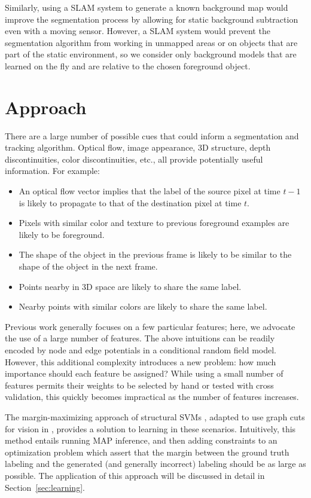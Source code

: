 \documentclass[journal]{IEEEtran}
\begin{document}
Similarly, using a SLAM system to generate a known background map
would improve the segmentation process by allowing for static background subtraction even with a moving sensor. However, a SLAM system would prevent the segmentation algorithm from working in unmapped areas or on objects that are part of the static environment, so we consider only background models that are learned on the fly and are relative to the chosen foreground object.

\section{Approach}

There are a large number of possible cues that could inform a segmentation and tracking algorithm.  Optical flow, image appearance, 3D structure, depth discontinuities, color discontinuities, etc., all provide potentially useful information.  For example:
\begin{itemize}
  \item An optical flow vector implies that the label of the source pixel at time $t-1$ is likely to propagate to that of the destination pixel at time $t$.
\item Pixels with similar color and texture to previous foreground examples are likely to be foreground.
\item The shape of the object in the previous frame is likely to be similar to the shape of the object in the next frame.
\item Points nearby in 3D space are likely to share the same label.
\item Nearby points with similar colors are likely to share the same label.
\end{itemize}

Previous work generally focuses on a few particular features; here, we advocate the use of a large number of features.  The above intuitions can be readily encoded by node and edge potentials in a conditional random field model.  However, this additional complexity introduces a new problem: how much importance should each feature be assigned?  While using a small number of features permits their weights to be selected by hand or tested with cross validation, this quickly becomes impractical as the number of features increases.

The margin-maximizing approach of structural SVMs \cite{taskar2005a, tsochantaridis2005a}, adapted to use graph cuts for vision in \cite{szummer2008a}, provides a solution to learning in these scenarios.  Intuitively, this method entails running MAP inference, and then adding constraints to an optimization problem which assert that the margin between the ground truth labeling and the generated (and generally incorrect) labeling should be as large as possible.  The application of this approach will be discussed in detail in Section~\ref{sec:learning}.
\end{document}
